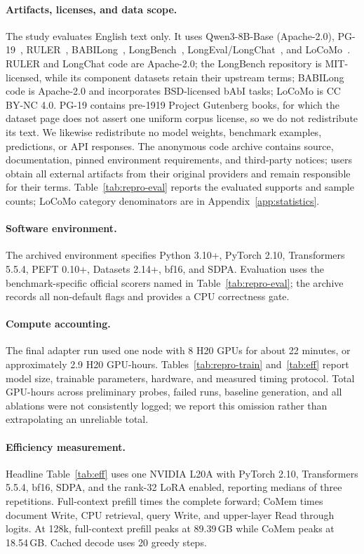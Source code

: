 \paragraph{Artifacts, licenses, and data scope.}
The study evaluates English text only. It uses Qwen3-8B-Base (Apache-2.0),
PG-19~\citep{pg19}, RULER~\citep{ruler}, BABILong~\citep{babilong},
LongBench~\citep{longbench}, LongEval/LongChat~\citep{longchat}, and
LoCoMo~\citep{locomo}. RULER and LongChat code are Apache-2.0; the LongBench
repository is MIT-licensed, while its component datasets retain their upstream
terms; BABILong code is Apache-2.0 and incorporates BSD-licensed bAbI tasks;
LoCoMo is CC BY-NC 4.0. PG-19 contains pre-1919 Project Gutenberg books, for
which the dataset page does not assert one uniform corpus license, so we do not
redistribute its text. We likewise redistribute no model weights, benchmark
examples, predictions, or API responses. The anonymous code archive contains
source, documentation, pinned environment requirements, and third-party notices;
users obtain all external artifacts from their original providers and remain
responsible for their terms. Table~\ref{tab:repro-eval} reports the evaluated
supports and sample counts; LoCoMo category denominators are in
Appendix~\ref{app:statistics}.

\paragraph{Software environment.}
The archived environment specifies Python 3.10+, PyTorch 2.10,
Transformers 5.5.4, PEFT 0.10+, Datasets 2.14+, bf16, and SDPA. Evaluation uses
the benchmark-specific official scorers named in Table~\ref{tab:repro-eval}; the
archive records all non-default flags and provides a CPU correctness gate.

\paragraph{Compute accounting.}
The final adapter run used one node with 8 H20 GPUs for about 22 minutes, or
approximately 2.9 H20 GPU-hours. Tables~\ref{tab:repro-train} and~\ref{tab:eff}
report model size, trainable parameters, hardware, and measured timing protocol.
Total GPU-hours across preliminary probes, failed runs, baseline generation, and
all ablations were not consistently logged; we report this omission rather than
extrapolating an unreliable total.

\paragraph{Efficiency measurement.}
\label{app:efficiency}
Headline Table~\ref{tab:eff} uses one NVIDIA L20A with PyTorch 2.10,
Transformers 5.5.4, bf16, SDPA, and the rank-32 LoRA enabled, reporting medians
of three repetitions. Full-context prefill times the complete forward; CoMem
times document Write, CPU retrieval, query Write, and upper-layer Read through
logits. At 128k, full-context prefill peaks at 89.39\,GB while CoMem peaks at
18.54\,GB. Cached decode uses 20 greedy steps.

